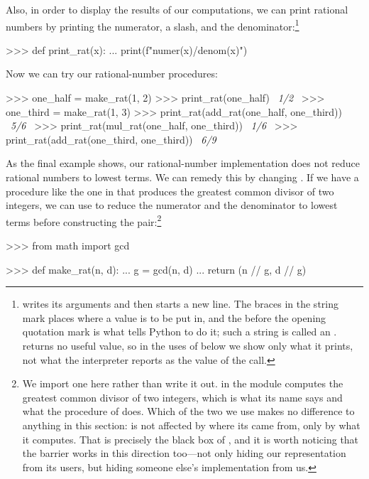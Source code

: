 \noindent
Also, in order to display the results of our computations, we can print
rational numbers by printing the numerator, a slash, and the
denominator:\footnote{ writes its arguments and then starts a new
line.  The braces in the string mark places where a value is to be put in, and
the  before the opening quotation mark is what tells Python to do it;
such a string is called an .   returns no useful
value, so in the uses of  below we show only what it prints,
not what the interpreter reports as the value of the call.}

\begin{codeBlock}
>>> def print_rat(x):
...     print(f"{numer(x)}/{denom(x)}")
\end{codeBlock}

\noindent
Now we can try our rational-number procedures:

\begin{codeBlock}
>>> one_half = make_rat(1, 2)
>>> print_rat(one_half)
~\textit{1/2}~
>>> one_third = make_rat(1, 3)
>>> print_rat(add_rat(one_half, one_third))
~\textit{5/6}~
>>> print_rat(mul_rat(one_half, one_third))
~\textit{1/6}~
>>> print_rat(add_rat(one_third, one_third))
~\textit{6/9}~
\end{codeBlock}

\noindent
As the final example shows, our rational-number implementation does not reduce
rational numbers to lowest terms.  We can remedy this by changing
. If we have a  procedure like the one in
 that produces the greatest common divisor of two integers, we can
use  to reduce the numerator and the denominator to lowest terms
before constructing the pair:\footnote{We import one here rather than write it
out.   in the  module computes the greatest common divisor
of two integers, which is what its name says and what the procedure of
 does.  Which of the two we use makes no difference to
anything in this section:  is not affected by where its
 came from, only by what it computes.  That is precisely the black
box of , and it is worth noticing that the barrier works in
this direction too---not only hiding our representation from its users, but
hiding someone else's implementation from us.}

\begin{codeBlock}
>>> from math import gcd

>>> def make_rat(n, d):
...     g = gcd(n, d)
...     return (n // g, d // g)
\end{codeBlock}

